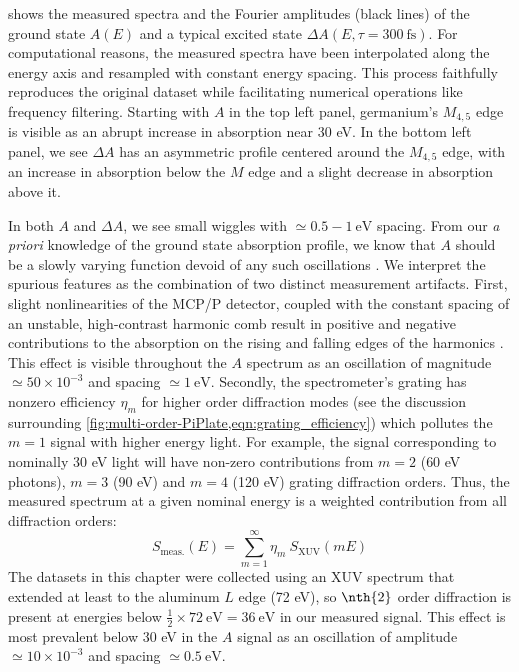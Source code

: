  shows the measured spectra and the Fourier amplitudes (black lines) of the ground state $A(E)$ and a typical excited state $\Delta A(E, \tau=300 \ \textrm{fs})$. For computational reasons, the measured spectra have been interpolated along the energy axis and resampled with constant energy spacing. This process faithfully reproduces the original dataset while facilitating numerical operations like frequency filtering. Starting with $A$ in the top left panel, germanium's $M_{4,5}$ edge is visible as an abrupt increase in absorption near 30 eV. In the bottom left panel, we see $\Delta A$ has an asymmetric profile centered around the $M_{4,5}$ edge, with an increase in absorption below the $M$ edge and a slight decrease in absorption above it.

In both $A$ and $\Delta A$, we see small wiggles with $\simeq 0.5 - 1 \ \textrm{eV}$ spacing. From our \textit{a priori} knowledge of the ground state absorption profile, we know that $A$ should be a slowly varying function devoid of any such oscillations \cite{zurchDirectSimultaneousObservation2017}. We interpret the spurious features as the combination of two distinct measurement artifacts. First, slight nonlinearities of the MCP/P detector, coupled with the constant spacing of an unstable, high-contrast harmonic comb result in positive and negative contributions to the absorption on the rising and falling edges of the harmonics \cite{linImpactSpatialChirp2016,cirriAchievingSurfaceSensitivity2017}. This effect is visible throughout the $A$ spectrum as an oscillation of magnitude $\simeq 50 \times 10^{-3}$ and spacing $\simeq 1 \ \textrm{eV}$. Secondly, the spectrometer's grating has nonzero efficiency $\eta_m$ for higher order diffraction modes (see the discussion surrounding \cref{fig:multi-order-PiPlate,eqn:grating_efficiency}) which pollutes the $m=1$ signal with higher energy light. For example, the signal corresponding to nominally {30 eV} light will have non-zero contributions from $m=2$ ({60 eV} photons), $m=3$ ({90 eV}) and $m=4$ ({120 eV}) grating diffraction orders. Thus, the measured spectrum at a given nominal energy is a weighted contribution from all diffraction orders:
\begin{equation}
S_{\textrm{meas.}}(E) = \sum_{m=1}^{\infty} \eta_m \ S_{\textrm{XUV}}(mE)
\end{equation}
The datasets in this chapter were collected using an XUV spectrum that extended at least to the aluminum $L$ edge (72 eV), so $\nth{2}$ order diffraction is present at energies below ${\frac{1}{2} \times 72 \ \textrm{eV} = 36 \ \textrm{eV}}$ in our measured signal. This effect is most prevalent below 30 eV in the $A$ signal as an oscillation of amplitude $\simeq 10 \times 10^{-3}$ and spacing $\simeq 0.5 \ \textrm{eV}$.

